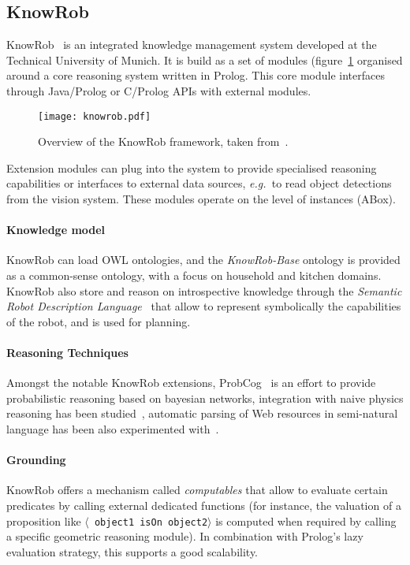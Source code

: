 \documentclass[journal]{IEEEtran}
\newcommand{\eg}{{\textit{e.g.\ }}}
\newcommand{\stmt}[1]{{\footnotesize \tt $\langle$ #1\relax$\rangle$}}
\begin{document}
\subsection{KnowRob}
\label{sect|knowrob}


{\sc KnowRob}~\cite{Tenorth2009a} is an integrated knowledge management system
developed at the Technical University of Munich. It is build as a set of
modules (figure~\ref{fig|knowrob} organised around a core reasoning system
written in Prolog. This core module interfaces through Java/Prolog or
C/Prolog APIs with external modules.

\begin{figure}
    \centering
    \texttt{[image: knowrob.pdf]}

    \caption{Overview of the {\sc KnowRob} framework, taken
    from~\cite{Tenorth2011}.}

    \label{fig|knowrob}
\end{figure}

Extension modules can plug into the system to provide specialised reasoning
capabilities or interfaces to external data sources, \eg to read object
detections from the vision system. These modules operate on the level of
instances (ABox).

\paragraph{Knowledge model} {\sc KnowRob} can load OWL ontologies, and the
\emph{KnowRob-Base} ontology is provided as a common-sense ontology, with a
focus on household and kitchen domains. {\sc KnowRob} also store and reason on
introspective knowledge through the \emph{Semantic Robot Description
Language}~\cite{Kunze2011} that allow to represent symbolically the
capabilities of the robot, and is used for planning.


\paragraph{Reasoning Techniques} Amongst the notable {\sc KnowRob} extensions,
{\sc ProbCog}~\cite{Jain2009} is an effort to provide probabilistic reasoning
based on bayesian networks, integration with naive physics reasoning has been
studied~\cite{Kunze2011a}, automatic parsing of Web resources in semi-natural
language has been also experimented with~\cite{Nyga2009}.

\paragraph{Grounding} {\sc KnowRob} offers a mechanism called \emph{computables} that allow to
evaluate certain predicates by calling external dedicated functions (for
instance, the valuation of a proposition like \stmt{object1 isOn object2} is
computed when required by calling a specific geometric reasoning module). In
combination with Prolog's lazy evaluation strategy, this supports a good
scalability.
\end{document}

